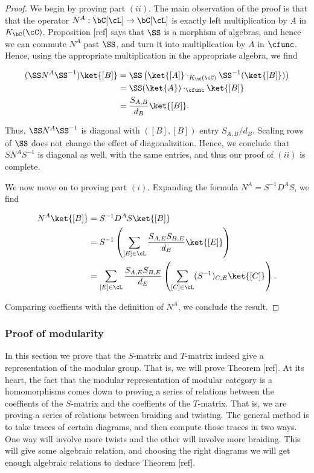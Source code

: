 \begin{proof} We begin by proving part $(ii)$. The main observation of the proof is that that the operator $N^{A}:\bC[\cL]\to\bC[\cL]$ is exactly left multiplication by $A$ in $K_{\bC}(\cC)$. Proposition [ref] says that $\SS$ is a morphism of algebras, and hence we can commute $N^{A}$ past $\SS$, and turn it into multiplication by $A$ in $\cfunc$. Hence, using the appropriate multiplication in the appropriate algebra, we find

\begin{align*}
(\SS N^{A}\SS^{-1}) \ket{[B]} & = \SS \left(\ket{[A]} \cdot_{K_{\bC}(\cC)} \SS^{-1}(\ket{[B]})\right)\\
& = \SS(\ket{A}) \cdot_{\cfunc} \ket{[B]}\\
& = \frac{S_{A,B}}{d_B}\ket{[B]}.
\end{align*}

Thus, $\SS N^{A}\SS^{-1}$ is diagonal with $([B],[B])$ entry $S_{A,B}/d_B$. Scaling rows of $\SS$ does not change the effect of diagonalizition. Hence, we conclude that $S N^{A}S^{-1}$ is diagonal as well, with the same entries, and thus our proof of $(ii)$ is complete.

We now move on to proving part $(i)$. Expanding the formula $N^{A}=S^{-1}D^{A}S$, we find

\begin{align*}
N^{A}\ket{[B]} &= S^{-1}D^{A}S \ket{[B]}\\
&=S^{-1}\left(\sum_{[E]\in\cL}\frac{S_{A,E} S_{B,E}}{d_E}\ket{[E]}\right)\\
&=\sum_{[E]\in\cL}\frac{S_{A,E} S_{B,E}}{d_E}\left(\sum_{[C]\in \cL}(S^{-1})_{C,E}\ket{[C]}\right).\\
\end{align*}

Comparing coeffients with the definition of $N^{A}$, we conclude the result.

\end{proof}


\subsubsection{Proof of modularity}

In this section we prove that the $S$-matrix and $T$-matrix indeed give a representation of the modular group. That is, we will prove Theorem [ref]. At its heart, the fact that the modular representation of modular category is a homomorphisms comes down to proving a series of relations between the coeffients of the $S$-matrix and the coeffients of the $T$-matrix. That is, we are proving a series of relations between braiding and twisting. The general method is to take traces of certain diagrams, and then compute those traces in two ways. One way will involve more twists and the other will involve more braiding. This will give some algebraic relation, and choosing the right diagrams we will get enough algebraic relations to deduce Theorem [ref].

